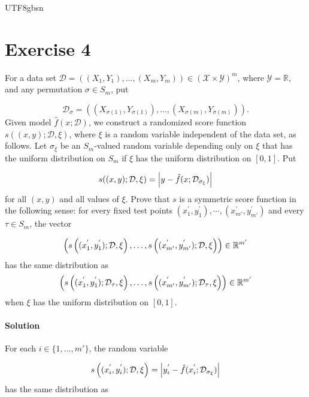 \documentclass[../../main.tex]{subfiles}
\begin{document}
\begin{CJK*}{UTF8}{gbsn}

\section*{Exercise 4}

For a data set $\mathcal{D} = ((X_1,Y_1), \ldots, (X_m, Y_m)) \in (\mathcal{X} \times \mathcal{Y})^m$,
where $\mathcal{Y} = \mathbb{R}$, and any permutation $\sigma \in S_m$, put 

\begin{equation*}
    \mathcal{D}_{\sigma} = ((X_{\sigma(1)},Y_{\sigma(1)}), \ldots, (X_{\sigma(m)}, Y_{\sigma(m)})).
\end{equation*}
Given model $\hat{f}(x; \mathcal{D})$,
we construct a randomized score function $s((x,y); \mathcal{D}, \xi)$,
where $\xi$ is a random variable independent of the data set,
as follows.
Let $\sigma_{\xi}$ be an $S_m$-valued random variable 
depending only on $\xi$ that has the uniform distribution on $S_m$
if $\xi$ has the uniform distribution on $[0,1]$.
Put 

\begin{equation*}
    s((x,y); \mathcal{D}, \xi) = \abs{y - \hat{f}(x; \mathcal{D}_{\sigma_{\xi}})}
\end{equation*}
for all $(x,y)$ and all values of $\xi$.
Prove that $s$ is a symmetric score function in the following sense:
for every fixed test points $(x_1^{'}, y_1^{'}), \cdots, (x_{m'}^{'}, y_{m'}^{'})$
and every $\tau \in S_m$,
the vector 

\begin{equation*}
    \left ( s\left ( (x_1^{'}, y_1^{'}); \mathcal{D}, \xi \right ), \ldots, s\left ( (x_{m'}^{'}, y_{m'}^{'}); \mathcal{D}, \xi \right ) \right ) 
    \in \mathbb{R}^{m'}
\end{equation*}
has the same distribution as 
\begin{equation*}
    \left ( s\left ( (x_1^{'}, y_1^{'}); \mathcal{D}_{\tau}, \xi \right ), \ldots, 
    s\left ( (x_{m'}^{'}, y_{m'}^{'}); \mathcal{D}_{\tau}, \xi \right ) \right ) 
    \in \mathbb{R}^{m'}
\end{equation*}
when $\xi$ has the uniform distribution on $[0,1]$.

\paragraph{Solution}
For each $i \in \{1, \ldots, m'\}$,
the random variable 

\begin{equation*}
    s\left ( (x_i^{'}, y_i^{'}); \mathcal{D}, \xi \right )
    = \abs{y_i^{'} - \hat{f}(x_i^{'}; \mathcal{D}_{\sigma_{\xi}})}
\end{equation*}
has the same distribution as 


\end{CJK*}
\end{document}
